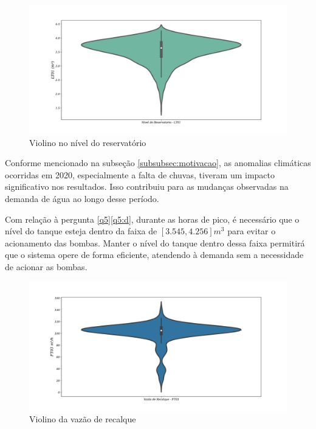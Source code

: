 	
	\begin{figure}[H]
		\centering
		\caption{Violino no nível do reservatório}
		\label{fig:hist}
		\includegraphics[width=0.9\linewidth]{Resultados/Figuras/viol}
		
	\end{figure}
	
Conforme mencionado na subseção \ref{subsubsec:motivacao}, as anomalias climáticas ocorridas em 2020, especialmente a falta de chuvas, tiveram um impacto significativo nos resultados. Isso contribuiu para as mudanças observadas na demanda de água ao longo desse período.

Com relação à pergunta \ref{q5}\ref{q5:d}, durante as horas de pico, é necessário que o nível do tanque esteja dentro da faixa de $[3.545,4.256] m^3$ para evitar o acionamento das bombas. Manter o nível do tanque dentro dessa faixa permitirá que o sistema opere de forma eficiente, atendendo à demanda sem a necessidade de acionar as bombas.
	
	
	\begin{figure}[H]
		\centering
		\caption{Violino da vazão de recalque}
		\label{fig:ft03}
		\includegraphics[width=0.9\linewidth]{Resultados/Figuras/ft03}
		
	\end{figure}
	
